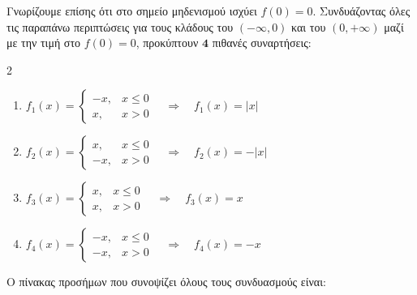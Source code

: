 Γνωρίζουμε επίσης ότι στο σημείο μηδενισμού ισχύει $f(0) = 0$. 
Συνδυάζοντας όλες τις παραπάνω περιπτώσεις για τους κλάδους του $(-\infty, 0)$ και του $(0, +\infty)$ μαζί με την τιμή στο $f(0)=0$, προκύπτουν $\mathbf{4}$ πιθανές συναρτήσεις:
\begin{multicols}{2}
\begin{enumerate}
    \item $f_1(x) = \begin{cases} -x, & x \le 0 \\ x, & x > 0 \end{cases} \quad \Rightarrow \quad f_1(x) = |x|$
    \item $f_2(x) = \begin{cases} x, & x \le 0 \\ -x, & x > 0 \end{cases} \quad \Rightarrow \quad f_2(x) = -|x|$
    \item $f_3(x) = \begin{cases} x, & x \le 0 \\ x, & x > 0 \end{cases} \quad \Rightarrow \quad f_3(x) = x$
    \item $f_4(x) = \begin{cases} -x, & x \le 0 \\ -x, & x > 0 \end{cases} \quad \Rightarrow \quad f_4(x) = -x$
\end{enumerate}
\end{multicols}

Ο πίνακας προσήμων που συνοψίζει όλους τους συνδυασμούς είναι:
\begin{center}
\end{center}


